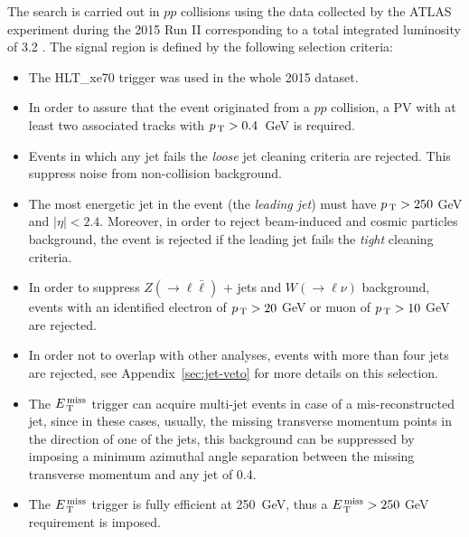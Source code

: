 The search is carried out in $pp$ collisions using the data collected by the
ATLAS experiment during the 2015 Run II corresponding to a total integrated
luminosity of 3.2 \ifb. The signal region is defined by the following selection
criteria:
\begin{itemize}
\item The HLT\_xe70 trigger was used in the whole 2015 dataset.
\item In order to assure that the event originated from a $pp$ collision, a PV
  with at least two associated tracks with $p_\mathrm{\, T} > 0.4$~GeV is required.
\item Events in which any jet fails the \emph{loose} jet cleaning criteria are
  rejected. This suppress noise from non-collision background.
\item The most energetic jet in the event (the \emph{leading jet}) must have
  $p_\mathrm{\, T} > 250~$GeV and $|\eta| < 2.4$. Moreover, in order to reject beam-induced
  and cosmic particles background, the event is rejected if the leading jet
  fails the \emph{tight} cleaning criteria.
\item In order to suppress $Z (\rightarrow \ell \bar{\ell})$ + jets and
  $W (\rightarrow \ell \nu)$ background, events with an identified electron of
  $p_\mathrm{\, T} > 20~$GeV or muon of $p_\mathrm{\, T} > 10~$GeV are rejected.
\item In order not to overlap with other analyses, events with more than four
  jets are rejected, see Appendix~\ref{sec:jet-veto} for more details on this
  selection.
\item The $E_\mathrm{\, T}^\mathrm{\, miss}$ trigger can acquire multi-jet events in case of a
  mis-reconstructed jet, since in these cases, usually, the missing transverse
  momentum points in the direction of one of the jets, this background can be
  suppressed by imposing a minimum azimuthal angle separation between the
  missing transverse momentum and any jet of 0.4.
\item The $E_\mathrm{\, T}^\mathrm{\, miss}$ trigger is fully efficient at 250~GeV, thus a $E_\mathrm{\, T}^\mathrm{\, miss} > 250~$GeV
  requirement is imposed.
\end{itemize}

